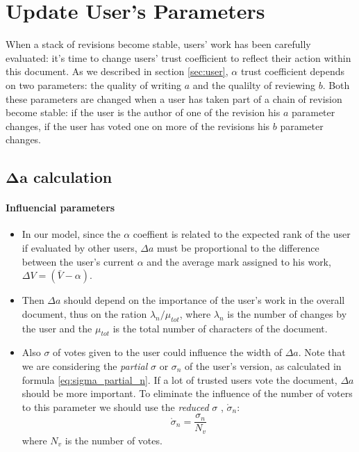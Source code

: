 \documentclass[a4paper,11pt]{article}
\newcommand{\sg}{$\sigma$ }
\newcommand{\al}{$\alpha$ }
\begin{document}
\section{Update User's Parameters} \label{sec:change_par}
When a stack of revisions become stable, users' work has been carefully evaluated: it's time to change users' trust coefficient to reflect their action within this document.
As we described in section \ref{sec:user}, \al trust coefficient depends on two parameters: the quality of writing $a$ and the qualilty of reviewing $b$.
Both these parameters are changed when a user has taken part of a chain of revision become stable: if the user is the author of one of the revision his $a$ parameter changes, if the user has voted one on more of the revisions his $b$ parameter changes.
 
\subsection{$\mathbf{\Delta a}$ calculation} \label{sec:deltaa}
\paragraph{Influencial parameters} 
\begin{itemize}
\item In our model, since the \al coeffient is related to the expected rank of the user if evaluated by other users, $\Delta a$ must be proportional to the difference between the user's current \al and the average mark assigned to his work, $\Delta V = ( \bar{V} - \alpha)$.
\item Then $\Delta a$ should depend on the importance of the user's work in the overall document, thus on the ration $\lambda_n / \mu_{tot}$, where $\lambda_n$ is the number of changes by the user and the $\mu_{tot}$ is the total number of characters of the document.
\item Also \sg of votes given to the user could influence the width of $\Delta a$. Note that we are considering the \emph{partial} \sg or $\sigma_n$ of the user's version, as calculated in formula \ref{eq:sigma_partial_n}. If a lot of trusted users vote the document, $\Delta a$ should be more important. To eliminate the influence of the number of voters to this parameter we should use the \emph{reduced} \sg, $\mathring{\sigma}_n$:
\begin{equation}
\mathring{\sigma} _n= \frac{\sigma_n}{N_v}
\end{equation}
where $N_v$ is the number of votes. 
\end{itemize}
\end{document}
